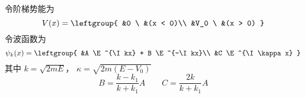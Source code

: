 
\begin{issues}
\issueDraft
\end{issues}

令阶梯势能为
\begin{equation}
V(x) = \leftgroup{
&0 \  &(x < 0)\\
&V_0 \  &(x > 0)
}\end{equation}
令波函数为
\begin{equation}
\psi_k(x) = \leftgroup{
&A \E^{\I kx} + B \E^{-\I kx}\\
&C \E^{\I \kappa x}
}\end{equation}
其中 $k = \sqrt{2mE}$， $\kappa = \sqrt{2m(E-V_0)}$
\begin{equation}
B = \frac{k - k_1}{k + k_1}A
\qquad
C = \frac{2k}{k + k_1} A
\end{equation}

